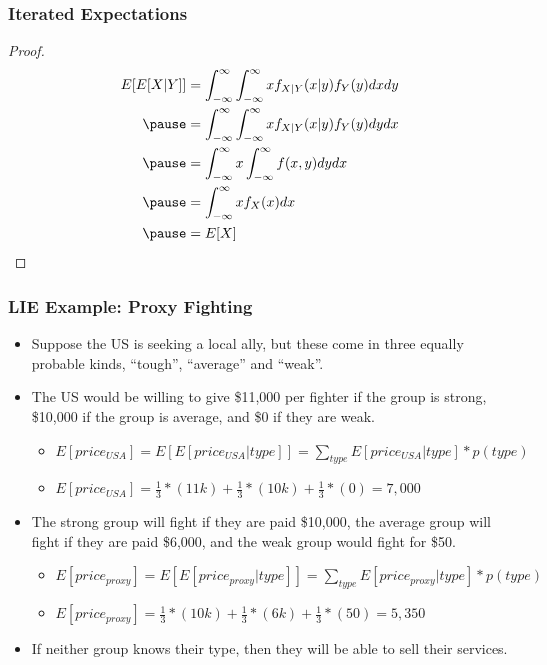 \documentclass[aspectratio=169, handout]{beamer}
\numberwithin{equation}{section}
\begin{document}
\begin{frame}
\frametitle{Iterated Expectations}

\begin{proof}
\begin{align*}
E[E[X|Y]] &= \int_{-\infty}^{\infty}  \int_{-\infty}^{\infty} x f_{X|Y} (x|y) f_{Y}(y) dx dy  \\ \pause 
&=  \int_{-\infty}^{\infty}  \int_{-\infty}^{\infty} x f_{X|Y} (x|y) f_{Y}(y) dy dx  \\ \pause 
&= \int_{-\infty}^{\infty} x \int_{-\infty}^{\infty}  f(x, y) dy dx   \\ \pause 
&= \int_{-\infty}^{\infty}  x f_{X}(x) dx   \\ \pause 
&= E[X]  
\end{align*}



\end{proof}
\end{frame}


\begin{frame}
\frametitle{LIE Example: Proxy Fighting}
\begin{itemize}
\item  Suppose the US is seeking a local ally, but these come in three equally probable kinds, ``tough'', ``average'' and ``weak''.
\item The US would be willing to give \$11,000 per fighter if the group is strong, \$10,000 if the group is average, and \$0 if they are weak.\pause
\begin{itemize}
\item $E[price_{USA}]=E[E[price_{USA}|type]]=\sum_{type}E[price_{USA}|type]*p(type)$\pause
\item $E[price_{USA}]=\frac{1}{3}*(11k)+\frac{1}{3}*(10k)+\frac{1}{3}*(0)=7,000$\pause

\end{itemize}
\item The strong group will fight if they are paid \$10,000, the average group will fight if they are paid \$6,000, and the weak group would fight for \$50.\pause
\begin{itemize}
\item $E[price_{proxy}]=E[E[price_{proxy}|type]]=\sum_{type}E[price_{proxy}|type]*p(type)$\pause
\item $E[price_{proxy}]=\frac{1}{3}*(10k)+\frac{1}{3}*(6k)+\frac{1}{3}*(50)=5,350$\pause
\end{itemize}
\item If neither group knows their type, then they will be able to sell their services.
\end{itemize}
\end{frame}
\end{document}

